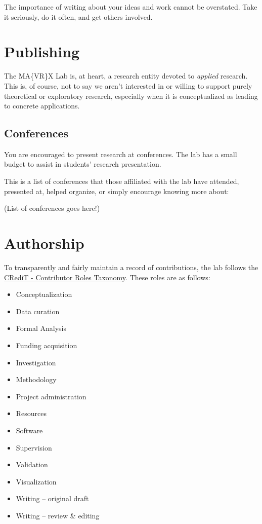 \documentclass[]{tufte-book}
\providecommand{\tightlist}{%
  \setlength{\itemsep}{0pt}\setlength{\parskip}{0pt}}
\begin{document}
The importance of writing about your ideas and work cannot be overstated. Take it seriously, do it often, and get others involved.

\hypertarget{publishing}{%
\section{Publishing}\label{publishing}}

The MA\{VR\}X Lab is, at heart, a research entity devoted to \emph{applied} research. This is, of course, not to say we aren't interested in or willing to support purely theoretical or exploratory research, especially when it is conceptualized as leading to concrete applications.

\hypertarget{conferences}{%
\subsection{Conferences}\label{conferences}}

You are encouraged to present research at conferences. The lab has a small budget to assist in students' research presentation.

This is a list of conferences that those affiliated with the lab have attended, presented at, helped organize, or simply encourage knowing more about:

(List of conferences goes here!)

\hypertarget{authorship}{%
\section{Authorship}\label{authorship}}

To transparently and fairly maintain a record of contributions, the lab follows the \href{https://casrai.org/credit/}{CRediT - Contributor Roles Taxonomy}. These roles are as follows:

\begin{itemize}
\tightlist
\item
  Conceptualization
\item
  Data curation
\item
  Formal Analysis
\item
  Funding acquisition
\item
  Investigation
\item
  Methodology
\item
  Project administration
\item
  Resources
\item
  Software
\item
  Supervision
\item
  Validation
\item
  Visualization
\item
  Writing -- original draft
\item
  Writing -- review \& editing
\end{itemize}
\end{document}
